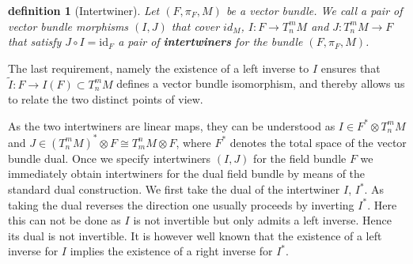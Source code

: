 \documentclass[a4paper,12pt, DIV=14, BCOR=5mm, twoside, headsepline, numbers=noenddot]{scrbook}
\newtheorem{definition}{definition}[section]
\newtheorem*{remark}{Remark}
\begin{document}
\begin{definition}[Intertwiner]\label{interDef}
Let $(F,\pi_F,M)$ be a vector bundle. We call a pair of vector bundle morphisms $(I, J)$ that cover $id_M$,
$I: F \rightarrow T^m_n M$ and $J: T^m_n M \rightarrow F $ that satisfy  $J \circ I = \mathrm{id}_F$ a pair of \textbf{\textit{intertwiners}} for the bundle $(F, \pi_F, M)$.
\end{definition}
The last requirement, namely the existence of a left inverse to $I$ ensures that $\tilde{I} : F \rightarrow I(F) \subset T^m_nM$ defines a vector bundle isomorphism, and thereby allows us to relate the two distinct points of view.

As the two intertwiners are linear maps, they can be understood as $I \in F^{\ast} \otimes T^m_n M$ and $J \in (T^m_nM)^{\ast} \otimes F \cong T^n_m M \otimes F$, where $F^{\ast}$ denotes the total space of the vector bundle dual. 
Once we specify intertwiners $(I,J)$ for the field bundle $F$ we immediately obtain intertwiners for the dual field bundle by means of the standard dual construction. We first take the dual of the intertwiner $I$, $I^{\ast}$. As taking the dual reverses the direction one usually proceeds by inverting $I^{\ast}$. Here this can not be done as $I$ is not invertible but only admits a left inverse. Hence its dual is not invertible. It is however well known that the existence of a left inverse for $I$ implies the existence of a right inverse for $I^{\ast}$. 
\end{document}
